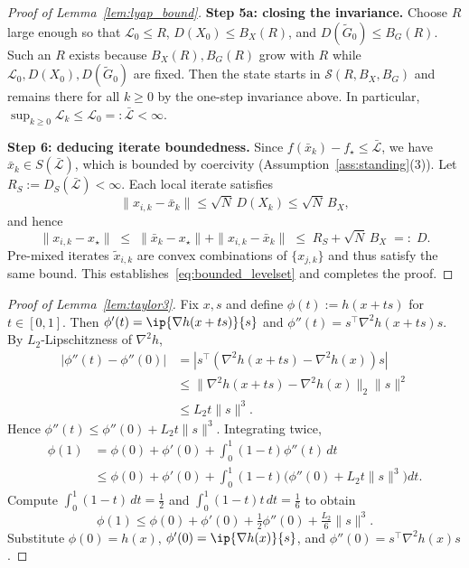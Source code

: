 \documentclass[review,onefignum,onetabnum]{siamart171218}
\begin{document}
\begin{proof}[Proof of Lemma~\ref{lem:lyap_bound}]
\noindent\textbf{Step 5a: closing the invariance.}
Choose $R$ large enough so that
$\mathcal L_0\le R$,
$D(X_0)\le B_X(R)$, and
$D(\tilde G_0)\le B_G(R)$.
Such an $R$ exists because $B_X(R),B_G(R)$ grow with $R$
while $\mathcal L_0,D(X_0),D(\tilde G_0)$ are fixed.
Then the state starts in $\mathcal S(R,B_X,B_G)$
and remains there for all $k\ge0$ by the one-step invariance above.
In particular, $\sup_{k\ge0}\mathcal L_k\le \mathcal L_0=:\bar{\mathcal L}<\infty$.

\smallskip
\noindent\textbf{Step 6: deducing iterate boundedness.}
Since $f(\bar x_k)-f_\star\le\bar{\mathcal L}$, we have
$\bar x_k\in S(\bar{\mathcal L})$,
which is bounded by coercivity (Assumption~\ref{ass:standing}(3)).
Let $R_S:=D_S(\bar{\mathcal L})<\infty$.
Each local iterate satisfies
\[
  \|x_{i,k}-\bar x_k\|\le\sqrt{N}\,D(X_k)\le\sqrt{N}\,B_X,
\]
and hence
\[
  \|x_{i,k}-x_\star\|
  \;\le\;
  \|\bar x_k-x_\star\|+\|x_{i,k}-\bar x_k\|
  \;\le\;
  R_S + \sqrt{N}\,B_X
  \;=:\; D.
\]
Pre-mixed iterates $\tilde x_{i,k}$ are convex combinations of
$\{x_{j,k}\}$ and thus satisfy the same bound.
This establishes~\eqref{eq:bounded_levelset} and completes the proof.
\end{proof}

\begin{proof}[Proof of Lemma~\ref{lem:taylor3}]
Fix $x,s$ and define $\phi(t):=h(x+ts)$ for $t\in[0,1]$.
Then $\phi'(t)=\ip{\nabla h(x+ts)}{s}$ and $\phi''(t)=s^\top\nabla^2 h(x+ts)s$.
By $L_2$-Lipschitzness of $\nabla^2 h$,
\begin{align*}
|\phi''(t)\!-\!\phi''(0)|
&=|s^\top(\nabla^2 h(x\!+\!ts)\!-\!\nabla^2 h(x))s|\\
&\le \|\nabla^2 h(x\!+\!ts)\!-\!\nabla^2 h(x)\|_2\|s\|^2\\
&\le L_2 t\|s\|^3.
\end{align*}
Hence $\phi''(t)\le \phi''(0)+L_2 t\|s\|^3$.
Integrating twice,
\begin{align*}
\phi(1)&=\phi(0)+\phi'(0)+\int_0^1\!(1\!-\!t)\phi''(t)\,dt\\
&\le \phi(0)+\phi'(0)+\!\int_0^1\!(1\!-\!t)\big(\phi''(0)+L_2 t\|s\|^3\big)dt.
\end{align*}
Compute $\int_0^1(1-t)\,dt=\tfrac12$ and $\int_0^1(1-t)t\,dt=\tfrac16$ to obtain
\[
\phi(1)\le \phi(0)+\phi'(0)+\tfrac12\phi''(0)+\tfrac{L_2}{6}\|s\|^3.
\]
Substitute $\phi(0)=h(x)$, $\phi'(0)=\ip{\nabla h(x)}{s}$, and $\phi''(0)=s^\top\nabla^2 h(x)s$.
\end{proof}
\end{document}
